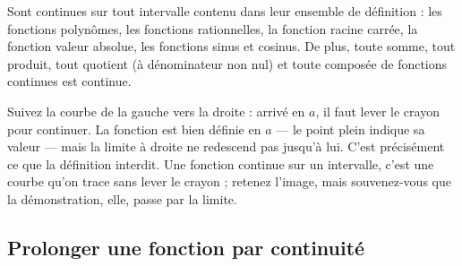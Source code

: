 
\begin{propriete}
Sont continues sur tout intervalle contenu dans leur ensemble de définition :
les fonctions polynômes, les fonctions rationnelles, la fonction racine
carrée, la fonction valeur absolue, les fonctions sinus et cosinus. De plus,
toute somme, tout produit, tout quotient (à dénominateur non nul) et toute
composée de fonctions continues est continue.
\end{propriete}

\begin{visualisation}
\begin{center}
\end{center}

Suivez la courbe de la gauche vers la droite : arrivé en $a$, il faut lever le
crayon pour continuer. La fonction est bien définie en $a$ — le point plein
indique sa valeur — mais la limite à droite ne redescend pas jusqu'à lui.
C'est précisément ce que la définition interdit. Une fonction continue sur un
intervalle, c'est une courbe qu'on trace sans lever le crayon ; retenez
l'image, mais souvenez-vous que la démonstration, elle, passe par la limite.
\end{visualisation}

\subsection{Prolonger une fonction par continuité}

